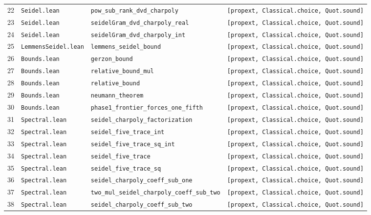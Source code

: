 \documentclass[11pt,reqno]{amsart}
\theoremstyle{definition}
\theoremstyle{remark}
\numberwithin{equation}{section}
\numberwithin{table}{section}
\begin{document}
{\begin{longtable}{@{}r>{\raggedright\arraybackslash}p{1.2in}>{\raggedright\arraybackslash}p{2.55in}>{\raggedright\arraybackslash}p{1.85in}@{}}
22 & \nolinkurl{Seidel.lean} & \nolinkurl{pow_sub_rank_dvd_charpoly} & \texttt{[propext, Classical.choice, Quot.sound]} \\
23 & \nolinkurl{Seidel.lean} & \nolinkurl{seidelGram_dvd_charpoly_real} & \texttt{[propext, Classical.choice, Quot.sound]} \\
24 & \nolinkurl{Seidel.lean} & \nolinkurl{seidelGram_dvd_charpoly_int} & \texttt{[propext, Classical.choice, Quot.sound]} \\
25 & \nolinkurl{LemmensSeidel.lean} & \nolinkurl{lemmens_seidel_bound} & \texttt{[propext, Classical.choice, Quot.sound]} \\
26 & \nolinkurl{Bounds.lean} & \nolinkurl{gerzon_bound} & \texttt{[propext, Classical.choice, Quot.sound]} \\
27 & \nolinkurl{Bounds.lean} & \nolinkurl{relative_bound_mul} & \texttt{[propext, Classical.choice, Quot.sound]} \\
28 & \nolinkurl{Bounds.lean} & \nolinkurl{relative_bound} & \texttt{[propext, Classical.choice, Quot.sound]} \\
29 & \nolinkurl{Bounds.lean} & \nolinkurl{neumann_theorem} & \texttt{[propext, Classical.choice, Quot.sound]} \\
30 & \nolinkurl{Bounds.lean} & \nolinkurl{phase1_frontier_forces_one_fifth} & \texttt{[propext, Classical.choice, Quot.sound]} \\
31 & \nolinkurl{Spectral.lean} & \nolinkurl{seidel_charpoly_factorization} & \texttt{[propext, Classical.choice, Quot.sound]} \\
32 & \nolinkurl{Spectral.lean} & \nolinkurl{seidel_five_trace_int} & \texttt{[propext, Classical.choice, Quot.sound]} \\
33 & \nolinkurl{Spectral.lean} & \nolinkurl{seidel_five_trace_sq_int} & \texttt{[propext, Classical.choice, Quot.sound]} \\
34 & \nolinkurl{Spectral.lean} & \nolinkurl{seidel_five_trace} & \texttt{[propext, Classical.choice, Quot.sound]} \\
35 & \nolinkurl{Spectral.lean} & \nolinkurl{seidel_five_trace_sq} & \texttt{[propext, Classical.choice, Quot.sound]} \\
36 & \nolinkurl{Spectral.lean} & \nolinkurl{seidel_charpoly_coeff_sub_one} & \texttt{[propext, Classical.choice, Quot.sound]} \\
37 & \nolinkurl{Spectral.lean} & \nolinkurl{two_mul_seidel_charpoly_coeff_sub_two} & \texttt{[propext, Classical.choice, Quot.sound]} \\
38 & \nolinkurl{Spectral.lean} & \nolinkurl{seidel_charpoly_coeff_sub_two} & \texttt{[propext, Classical.choice, Quot.sound]} \\

\end{longtable}}
\end{document}
